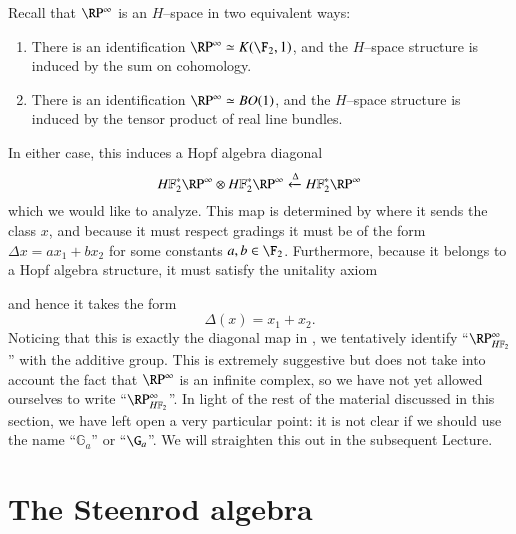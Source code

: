 \begin{example}\label{RPExampleFaulty}
Recall that $\RP^\infty$ is an $H$--space in two equivalent ways:
\begin{enumerate}
\item There is an identification $\RP^\infty \simeq K(\F_2, 1)$, and the $H$--space structure is induced by the sum on cohomology.
\item There is an identification $\RP^\infty \simeq BO(1)$, and the $H$--space structure is induced by the tensor product of real line bundles.
\end{enumerate}
In either case, this induces a Hopf algebra diagonal \[\HFtwo^* \RP^\infty \otimes \HFtwo^* \RP^\infty \xleftarrow\Delta \HFtwo^* \RP^\infty\] which we would like to analyze.  This map is determined by where it sends the class $x$, and because it must respect gradings it must be of the form $\Delta x = ax_1 + bx_2$ for some constants $a, b \in \F_2$.  Furthermore, because it belongs to a Hopf algebra structure, it must satisfy the unitality axiom
\begin{center}
\end{center}
and hence it takes the form \[\Delta(x) = x_1 + x_2.\]  Noticing that this is exactly the diagonal map in , we tentatively identify ``$\RP^\infty_{\HFtwo}$'' with the additive group.  This is extremely suggestive but does not take into account the fact that $\RP^\infty$ is an infinite complex, so we have not yet allowed ourselves to write ``$\RP^\infty_{\HFtwo}$''.  In light of the rest of the material discussed in this section, we have left open a very particular point: it is not clear if we should use the name ``$\mathbb G_a$'' or ``$\G_a$''.  We will straighten this out in the subsequent Lecture.
\end{example}








\section{The Steenrod algebra}\label{TheSteenrodAlgebraSection}

